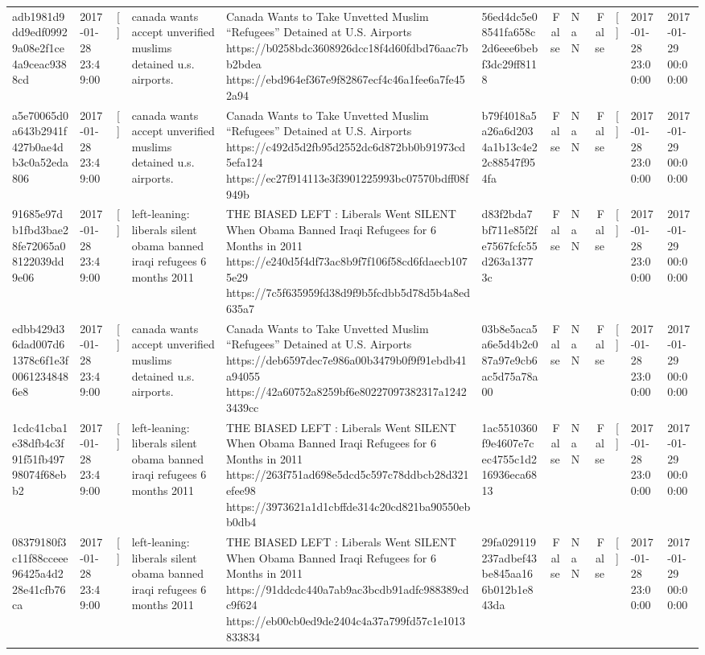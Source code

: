\begin{tabular}{llllllrlrlll}
adb1981d9dd9edf09929a08e2f1ce4a9ceac9388cd & 2017-01-28 23:49:00 & [] & canada wants accept unverified muslims detained u.s. airports. & Canada Wants to Take Unvetted Muslim “Refugees” Detained at U.S. Airports https://b0258bdc3608926dcc18f4d60fdbd76aac7bb2bdea https://ebd964ef367e9f82867ecf4c46a1fee6a7fe452a94 & 56ed4dc5e08541fa658c2d6eee6bebf3dc29ff8118 & False & NaN & False & [] & 2017-01-28 23:00:00 & 2017-01-29 00:00:00 \\
a5e70065d0a643b2941f427b0ae4db3c0a52eda806 & 2017-01-28 23:49:00 & [] & canada wants accept unverified muslims detained u.s. airports. & Canada Wants to Take Unvetted Muslim “Refugees” Detained at U.S. Airports https://c492d5d2fb95d2552dc6d872bb0b91973cd5efa124 https://ec27f914113e3f3901225993bc07570bdff08f949b & b79f4018a5a26a6d2034a1b13c4e22c88547f954fa & False & NaN & False & [] & 2017-01-28 23:00:00 & 2017-01-29 00:00:00 \\
91685e97db1fbd3bae28fe72065a08122039dd9e06 & 2017-01-28 23:49:00 & [] & left-leaning: liberals silent obama banned iraqi refugees 6 months 2011 & THE BIASED LEFT : Liberals Went SILENT When Obama Banned Iraqi Refugees for 6 Months in 2011 https://e240d5f4df73ac8b9f7f106f58cd6fdaecb1075e29 https://7c5f635959fd38d9f9b5fcdbb5d78d5b4a8ed635a7 & d83f2bda7bf711e85f2fe7567fcfc55d263a13773c & False & NaN & False & [] & 2017-01-28 23:00:00 & 2017-01-29 00:00:00 \\
edbb429d36dad007d61378c6f1e3f00612348486e8 & 2017-01-28 23:49:00 & [] & canada wants accept unverified muslims detained u.s. airports. & Canada Wants to Take Unvetted Muslim “Refugees” Detained at U.S. Airports https://deb6597dec7e986a00b3479b0f9f91ebdb41a94055 https://42a60752a8259bf6e80227097382317a12423439cc & 03b8e5aca5a6e5d4b2c087a97e9cb6ac5d75a78a00 & False & NaN & False & [] & 2017-01-28 23:00:00 & 2017-01-29 00:00:00 \\
1cdc41cba1e38dfb4c3f91f51fb49798074f68ebb2 & 2017-01-28 23:49:00 & [] & left-leaning: liberals silent obama banned iraqi refugees 6 months 2011 & THE BIASED LEFT : Liberals Went SILENT When Obama Banned Iraqi Refugees for 6 Months in 2011 https://263f751ad698e5dcd5c597c78ddbcb28d321efee98 https://3973621a1d1cbffde314c20cd821ba90550ebb0db4 & 1ac5510360f9e4607e7cec4755c1d216936eca6813 & False & NaN & False & [] & 2017-01-28 23:00:00 & 2017-01-29 00:00:00 \\
08379180f3c11f88cceee96425a4d228e41cfb76ca & 2017-01-28 23:49:00 & [] & left-leaning: liberals silent obama banned iraqi refugees 6 months 2011 & THE BIASED LEFT : Liberals Went SILENT When Obama Banned Iraqi Refugees for 6 Months in 2011 https://91ddcdc440a7ab9ac3bcdb91adfc988389cdc9f624 https://eb00cb0ed9de2404c4a37a799fd57c1e1013833834 & 29fa029119237adbef43be845aa166b012b1e843da & False & NaN & False & [] & 2017-01-28 23:00:00 & 2017-01-29 00:00:00 \\

\end{tabular}
